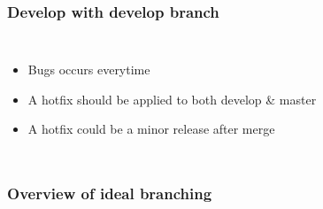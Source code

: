 \documentclass{beamer}
\begin{document}
\begin{frame}
	\frametitle{Develop with develop branch}	
	\begin{columns}[c]
	\column{1.5in}
	\begin{itemize}
		\item Bugs occurs everytime
		\item A hotfix should be applied to both develop \& master
		\item A hotfix could be a minor release after merge
	\end{itemize}
	\column{1.5in}
	\end{columns}
\end{frame}
\begin{frame}
	\frametitle{Overview of ideal branching}
\end{frame}
\end{document}
